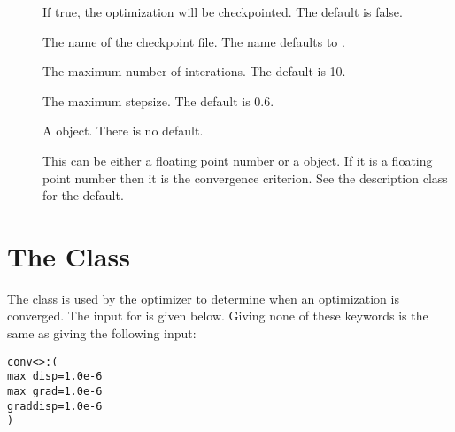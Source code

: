 \begin{description}
  \item[] If true, the optimization will be checkpointed.
     The default is false.

  \item[] The name of the checkpoint file.
     The name defaults to .

  \item[] The maximum number of interations.
     The default is 10.

  \item[] The maximum stepsize.  The default is 0.6.

  \item[] A  object.  There is
     no default.

  \item[] This can be either a floating point number
     or a  object.  If it is a floating point
     number then it is the convergence criterion.  See the description
      class for the default.

\end{description}


\section{The  Class}\label{Convergence}

The  class is used by the optimizer to determine
when an optimization is converged.  The  input for
 is given below.  Giving none of these keywords 
is the same as giving the following input:
\begin{alltt}
  conv<>: (
    max_disp = 1.0e-6
    max_grad = 1.0e-6
    graddisp = 1.0e-6
  )
\end{alltt}

